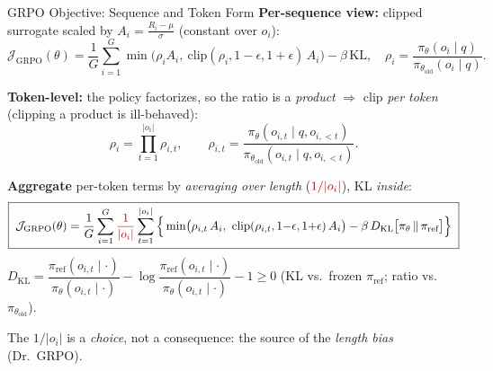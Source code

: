 \begin{frame}{GRPO Objective: Sequence and Token Form}
  \textbf{Per-sequence view:} clipped surrogate scaled by $A_i = \tfrac{R_i-\mu}{\sigma}$ (constant over $o_i$):
  \[
    \mathcal{J}_\text{GRPO}(\theta)
      = \frac{1}{G}\sum_{i=1}^{G} \min\!\big(\rho_i A_i,\ \mathrm{clip}(\rho_i,1{-}\epsilon,1{+}\epsilon)\,A_i\big) - \beta\,\mathrm{KL},
    \quad
    \rho_i = \frac{\pi_\theta(o_i\mid q)}{\pi_{\theta_\text{old}}(o_i\mid q)}.
  \]

  \textbf{Token-level:} the policy factorizes, so the ratio is a \emph{product} $\Rightarrow$ clip \emph{per token} (clipping a product is ill-behaved):
  \[
    \rho_i = \prod_{t=1}^{|o_i|}\rho_{i,t},
    \qquad
    \rho_{i,t} = \frac{\pi_\theta(o_{i,t}\mid q,o_{i,<t})}{\pi_{\theta_\text{old}}(o_{i,t}\mid q,o_{i,<t})}.
  \]

  \textbf{Aggregate} per-token terms by \emph{averaging over length} (${\color{red!70!black}1/|o_i|}$), KL \emph{inside}:
  \[
    \boxed{\;
    \mathcal{J}_\text{GRPO}(\theta)
      = \frac{1}{G}\sum_{i=1}^{G} {\color{red!70!black}\frac{1}{|o_i|}} \sum_{t=1}^{|o_i|}
        \Big\{\min\!\big(\rho_{i,t}\,A_i,\ \mathrm{clip}(\rho_{i,t},1{-}\epsilon,1{+}\epsilon)\,A_i\big) - \beta\, D_\text{KL}\big[\pi_\theta \,\|\, \pi_\text{ref}\big]\Big\}
    \;}
  \]
  {\footnotesize $D_\text{KL} = \dfrac{\pi_\text{ref}(o_{i,t}\mid\cdot)}{\pi_\theta(o_{i,t}\mid\cdot)} - \log\dfrac{\pi_\text{ref}(o_{i,t}\mid\cdot)}{\pi_\theta(o_{i,t}\mid\cdot)} - 1 \geq 0$ (KL vs.\ frozen $\pi_\text{ref}$; ratio vs.\ $\pi_{\theta_\text{old}}$).}

  \vspace{0.2em}
  The {\color{red!70!black}$1/|o_i|$} is a \emph{choice}, not a consequence: the source of the \emph{length bias} (Dr.\ GRPO).
\end{frame}


